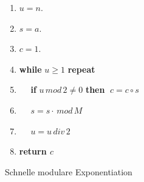 \documentclass[12pt,oneside]{article}
\theoremstyle{remark}
\theoremstyle{definition}
\begin{document}
\begin{algorithm}[H]
\SetAlgoLined
{}
\begin{enumerate}
    \item $u = n$.
    \item $s = a$.
    \item $c = 1$.
    \item \textbf{while} $u \geq 1$ \textbf{repeat}
    \item $\; \: \: \;$ \textbf{if} $u \, mod \, 2 \neq 0$ \textbf{then}
       $ \; c = c \circ s$
     \item $\; \: \: \;$ $s = s \cdot \, mod \, M$
     \item $\; \: \: \;$ $ u = u \, div \, 2$
     \item \textbf{return $c$}
\end{enumerate}
 \caption{Schnelle modulare Exponentiation}
 \label{appendix:fast_expo}
\end{algorithm}

\newpage

\listoffigures

\listoftables
\clearpage


\end{document}
